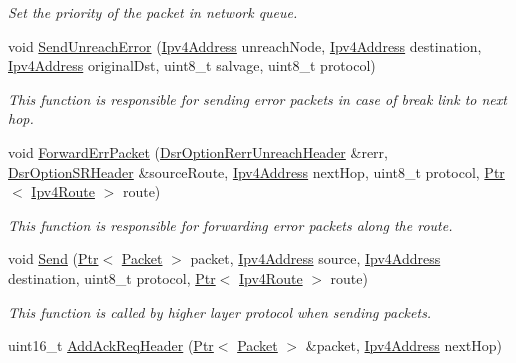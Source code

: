 \begin{DoxyCompactItemize}
\begin{DoxyCompactList}\small\item\em Set the priority of the packet in network queue. \end{DoxyCompactList}\item 
void \hyperlink{classns3_1_1dsr_1_1DsrRouting_ace5dd08bac91fa199ddfac7e81125a62}{Send\+Unreach\+Error} (\hyperlink{classns3_1_1Ipv4Address}{Ipv4\+Address} unreach\+Node, \hyperlink{classns3_1_1Ipv4Address}{Ipv4\+Address} destination, \hyperlink{classns3_1_1Ipv4Address}{Ipv4\+Address} original\+Dst, uint8\+\_\+t salvage, uint8\+\_\+t protocol)
\begin{DoxyCompactList}\small\item\em This function is responsible for sending error packets in case of break link to next hop. \end{DoxyCompactList}\item 
void \hyperlink{classns3_1_1dsr_1_1DsrRouting_a2c5629706b8a73cce84964231ac93d6b}{Forward\+Err\+Packet} (\hyperlink{classns3_1_1dsr_1_1DsrOptionRerrUnreachHeader}{Dsr\+Option\+Rerr\+Unreach\+Header} \&rerr, \hyperlink{classns3_1_1dsr_1_1DsrOptionSRHeader}{Dsr\+Option\+S\+R\+Header} \&source\+Route, \hyperlink{classns3_1_1Ipv4Address}{Ipv4\+Address} next\+Hop, uint8\+\_\+t protocol, \hyperlink{classns3_1_1Ptr}{Ptr}$<$ \hyperlink{classns3_1_1Ipv4Route}{Ipv4\+Route} $>$ route)
\begin{DoxyCompactList}\small\item\em This function is responsible for forwarding error packets along the route. \end{DoxyCompactList}\item 
void \hyperlink{classns3_1_1dsr_1_1DsrRouting_af67eeb07193d10db8308cb4ecbe08b02}{Send} (\hyperlink{classns3_1_1Ptr}{Ptr}$<$ \hyperlink{classns3_1_1Packet}{Packet} $>$ packet, \hyperlink{classns3_1_1Ipv4Address}{Ipv4\+Address} source, \hyperlink{classns3_1_1Ipv4Address}{Ipv4\+Address} destination, uint8\+\_\+t protocol, \hyperlink{classns3_1_1Ptr}{Ptr}$<$ \hyperlink{classns3_1_1Ipv4Route}{Ipv4\+Route} $>$ route)
\begin{DoxyCompactList}\small\item\em This function is called by higher layer protocol when sending packets. \end{DoxyCompactList}\item 
uint16\+\_\+t \hyperlink{classns3_1_1dsr_1_1DsrRouting_a8ce910f1c56dc238ff98117c784c4541}{Add\+Ack\+Req\+Header} (\hyperlink{classns3_1_1Ptr}{Ptr}$<$ \hyperlink{classns3_1_1Packet}{Packet} $>$ \&packet, \hyperlink{classns3_1_1Ipv4Address}{Ipv4\+Address} next\+Hop)

\end{DoxyCompactItemize}
